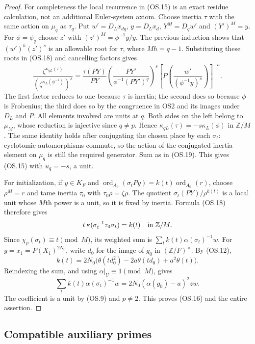 \begin{proof}
For completeness the local recurrence in (OS.15) is an exact residue
calculation, not an additional Euler-system axiom.  Choose inertia
$\tau$ with the same action on $\mu_q$ as $\tau_q$.
Put $w'=D_Lx_{dq}$, $y=D_Lx_d$, $Y^M=D_qw'$ and $(Y')^M=y$.
For $\phi=\phi_q$ choose $z'$ with $(z')^M=\phi^{-1}y/y$.
The previous induction shows that $(w')^h(z')^s$ is an allowable
root for $\tau$, where $Mh=q-1$.
Substituting these roots in (OS.18) and cancelling factors gives
\[
 \frac{\zeta^{\kappa_{qL}(\tau)}}
      {(\zeta^{\kappa_L(\phi^{-1})})^s}
 =\frac{\tau(PY)}{PY}
   \left(\frac{PY'}{\phi^{-1}(PY')^q}\right)^s
   \left[P\!\left(\frac{w'}{(\phi^{-1}y)^s}\right)\right]^{-h}.
 \tag{OS.20}
\]
The first factor reduces to one because $\tau$ is inertia; the
second does so because $\phi$ is Frobenius; the third does so by
the congruence in OS2 and its images under $D_L$ and $P$.
All elements involved are units at $q$.
Both sides on the left belong to $\mu_M$, whose reduction is
injective since $q\ne p$.  Hence
$\kappa_{qL}(\tau)=-s\kappa_L(\phi)$ in $\mathbb Z/M$.
The same identity holds after conjugating the chosen place by each
$\sigma_t$: cyclotomic automorphisms commute, so the action of
the conjugated inertia element on $\mu_q$ is still the required
generator.  Sum as in (OS.19).  This gives (OS.15) with
$u_q=-s$, a unit.

For initialization, if $y\in K_F$ and
$\operatorname{ord}_{A_0}(\sigma_tPy)=k(t)
\operatorname{ord}_{A_0}(r)$, choose $\rho^M=r$ and tame inertia
$\tau_0$ with $\tau_0\rho=\zeta\rho$.
The quotient $\sigma_t(PY)/\rho^{k(t)}$ is a local unit whose
$M$th power is a unit, so it is fixed by inertia.  Formula (OS.18)
therefore gives
\[
       t\,\kappa(\sigma_t^{-1}\tau_0\sigma_t)=k(t)
                         \quad\hbox{in }\mathbb Z/M.
\]
Since $\chi_p(\sigma_t)\equiv t\pmod M$, its weighted sum is
$\sum_t k(t)\alpha(\sigma_t)^{-1}w$.
For $y=x_1=P(X_1)^{2N_0}$, write $d_0$ for the image of $g_0$
in $(\mathbb Z/F)^\times$.  By (OS.12),
\[
 k(t)=2N_0\bigl(\theta(td_0^2)-2a\theta(td_0)+a^2\theta(t)\bigr).
\]
Reindexing the sum, and using $\alpha|_U\equiv1\pmod M$, gives
\[
 \sum_t k(t)\alpha(\sigma_t)^{-1}w
       =2N_0(\alpha(g_0)-a)^2zw.
\]
The coefficient is a unit by (OS.9) and $p\ne2$.
This proves (OS.16) and the entire assertion.
\end{proof}

\subsection{Compatible auxiliary primes}

